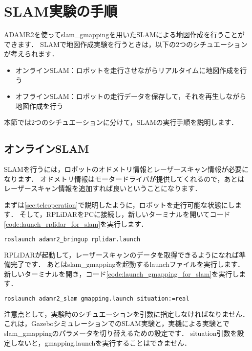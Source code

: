 \documentclass[{../../master}]{subfiles}
\begin{document}
\section{SLAM実験の手順}

ADAMR2を使って\textsf{slam\_gmapping}を用いたSLAMによる地図作成を行うことができます．
SLAMで地図作成実験を行うときは，以下の2つのシチュエーションが考えられます．

\begin{itemize}
  \item オンラインSLAM：ロボットを走行させながらリアルタイムに地図作成を行う
  \item オフラインSLAM：ロボットの走行データを保存して，それを再生しながら地図作成を行う
\end{itemize}

本節では2つのシチュエーションに分けて，SLAMの実行手順を説明します．

\subsection{オンラインSLAM}

SLAMを行うには，ロボットのオドメトリ情報とレーザースキャン情報が必要になります．
オドメトリ情報はモータードライバが提供してくれるので，あとはレーザースキャン情報を追加すれば良いということになります．

まずは\ref{sec:teleoperation}で説明したように，ロボットを走行可能な状態にします．
そして，RPLiDARをPCに接続し，新しいターミナルを開いてコード\ref{code:launch_rplidar_for_slam}を実行します．

\begin{lstlisting}[language=sh, label=code:launch_rplidar_for_slam, caption=Launch \textsf{rplidar.launch}]
roslaunch adamr2_bringup rplidar.launch
\end{lstlisting}

RPLiDARが起動して，レーザースキャンのデータを取得できるようになれば準備完了です．
あとは\textsf{slam\_gmapping}を起動するlaunchファイルを実行します．
新しいターミナルを開き，コード\ref{code:launch_gmapping_for_slam}を実行します．

\begin{lstlisting}[language=sh, label=code:launch_gmapping_for_slam, caption= Launch \textsf{gmapping.launch}]
roslaunch adamr2_slam gmapping.launch situation:=real
\end{lstlisting}

注意点として，実験時のシチュエーションを引数に指定しなければなりません．
これは，GazeboシミュレーションでのSLAM実験と，実機による実験とで\textsf{slam\_gmapping}のパラメータを切り替えるための設定です．
\textsf{situation}引数を設定しないと，\textsf{gmapping.launch}を実行することはできません．
\end{document}
